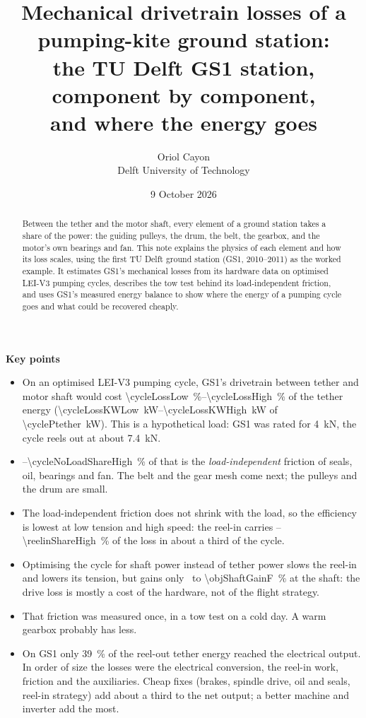 \documentclass[11pt,a4paper]{article}
\title{Mechanical drivetrain losses of a pumping-kite ground station:\\
the TU Delft GS1 station, component by component,\\
and where the energy goes}
\author{Oriol Cayon\\\small Delft University of Technology}
\date{9 October 2026}
\newcommand{\keybox}[1]{\par\smallskip\noindent\colorbox{boxbg}{%
  \parbox{\dimexpr\textwidth-2\fboxsep\relax}{\small #1}}\par\smallskip}
\begin{document}
\maketitle
\thispagestyle{fancy}

\begin{abstract}
Between the tether and the motor shaft, every element of a ground station takes
a share of the power: the guiding pulleys, the drum, the belt, the gearbox, and
the motor's own bearings and fan. This note explains the physics of each element
and how its loss scales, using the first TU Delft ground station (GS1,
2010--2011) as the worked example. It estimates GS1's mechanical losses from its
hardware data on optimised LEI-V3 pumping cycles, describes the tow test behind
its load-independent friction, and uses GS1's measured energy balance to show
where the energy of a pumping cycle goes and what could be recovered cheaply.
\end{abstract}

\keybox{\textbf{Key points}
\begin{itemize}[leftmargin=1.2em]
  \item On an optimised LEI-V3 pumping cycle, GS1's drivetrain between tether
    and motor shaft would cost \SIrange{\cycleLossLow}{\cycleLossHigh}{\percent}
    of the tether energy (\SIrange{\cycleLossKWLow}{\cycleLossKWHigh}{kW} of
    \SI{\cyclePtether}{kW}). This is a hypothetical load: GS1 was rated for
    \SI{4}{kN}, the cycle reels out at about \SI{7.4}{kN}.
  \item \cycleNoLoadShareLow--\SI{\cycleNoLoadShareHigh}{\percent} of that is the
    \emph{load-independent} friction of seals, oil, bearings and fan. The belt
    and the gear mesh come next; the pulleys and the drum are small.
  \item The load-independent friction does not shrink with the load, so the
    efficiency is lowest at low tension and high speed: the reel-in carries
    \reelinShareLow--\SI{\reelinShareHigh}{\percent} of the loss in about a
    third of the cycle.
  \item Optimising the cycle for shaft power instead of tether power slows the
    reel-in and lowers its tension, but gains only \objShaftGainB\ to
    \SI{\objShaftGainF}{\percent} at the shaft: the drive loss is mostly a cost
    of the hardware, not of the flight strategy.
  \item That friction was measured once, in a tow test on a cold day. A warm
    gearbox probably has less.
  \item On GS1 only \SI{39}{\percent} of the reel-out tether energy reached the
    electrical output. In order of size the losses were the electrical
    conversion, the reel-in work, friction and the auxiliaries. Cheap fixes
    (brakes, spindle drive, oil and seals, reel-in strategy) add about a third
    to the net output; a better machine and inverter add the most.
\end{itemize}}
\end{document}
